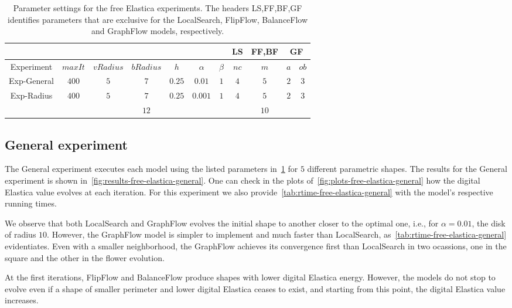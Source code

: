 \begin{table}
\centering
\begin{tabular}{|c|c|c|c|c|c|c|c|c|c|c|}
\cline{8-11}
\multicolumn{7}{c|}{} & LS & FF,BF & \multicolumn{2}{|c|}{GF}\\
\hline
Experiment & $maxIt$ & $vRadius$ & $bRadius$ & $h$ & $\alpha$ & $\beta$  & $nc$ & $m$ & $a$ & $ob$ \\
\hline
Exp-General & $400$ & $5$ & $7$ & $0.25$ & $0.01$ & $1$  & $4$ & $5$ & $2$ & $3$ \\
\hline
\multirow{2}{*}{Exp-Radius} & \multirow{2}{*}{$400$} & \multirow{2}{*}{$5$} & $7$ & \multirow{2}{*}{$0.25$} &  \multirow{2}{*}{$0.001$} & \multirow{2}{*}{$1$}  & \multirow{2}{*}{$4$} & $5$ & \multirow{2}{*}{$2$} & \multirow{2}{*}{$3$} \\
& &  & $12$ & &  & & & $10$ & &  \\
\hline
\end{tabular}
\caption{Parameter settings for the free Elastica experiments. The headers LS,FF,BF,GF identifies parameters that are exclusive for the LocalSearch, FlipFlow, BalanceFlow and GraphFlow models, respectively.}
\label{tab:free-elastica-parameters-summary}
\end{table}

\subsection{General experiment}

  The General experiment executes each model using the listed parameters in~\cref{tab:free-elastica-parameters-summary} for $5$ different parametric shapes. The results for the General experiment is shown in~\cref{fig:results-free-elastica-general}. One can check in the plots of~\cref{fig:plots-free-elastica-general} how the digital Elastica value evolves at each iteration. For this experiment we also provide~\cref{tab:rtime-free-elastica-general} with the model's respective running times.
  

We observe that both LocalSearch and GraphFlow evolves the initial shape to another closer to the optimal one, i.e., for $\alpha=0.01$, the disk of radius $10$. However, the GraphFlow model is simpler to implement and much faster than LocalSearch, as~\cref{tab:rtime-free-elastica-general} evidentiates. Even with a smaller neighborhood, the GraphFlow achieves its convergence first than LocalSearch in two ocassions, one in the square and the other in the flower evolution.

At the first iterations, FlipFlow and BalanceFlow produce shapes with lower digital Elastica energy. However, the models do not stop to evolve even if a shape of smaller perimeter and lower digital Elastica ceases to exist, and starting from this point, the digital Elastica value increases.



